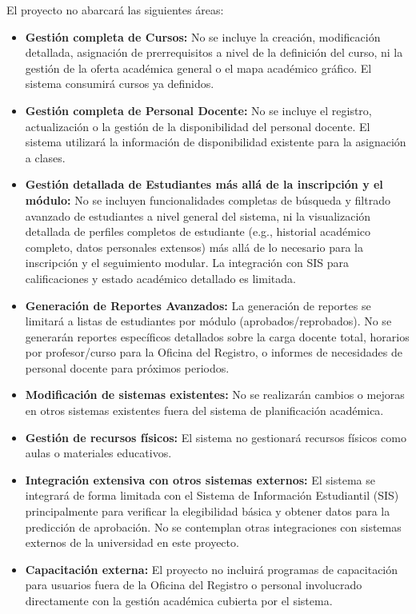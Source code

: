 El proyecto no abarcará las siguientes áreas:
\begin{itemize}
    \item \textbf{Gestión completa de Cursos:} No se incluye la creación, modificación detallada, asignación de prerrequisitos a nivel de la definición del curso, ni la gestión de la oferta académica general o el mapa académico gráfico.
    El sistema consumirá cursos ya definidos.
    \item \textbf{Gestión completa de Personal Docente:} No se incluye el registro, actualización o la gestión de la disponibilidad del personal docente.
    El sistema utilizará la información de disponibilidad existente para la asignación a clases.
    \item \textbf{Gestión detallada de Estudiantes más allá de la inscripción y el módulo:} No se incluyen funcionalidades completas de búsqueda y filtrado avanzado de estudiantes a nivel general del sistema, ni la visualización detallada de perfiles completos de estudiante (e.g., historial académico completo, datos personales extensos) más allá de lo necesario para la inscripción y el seguimiento modular.
    La integración con SIS para calificaciones y estado académico detallado es limitada.
    \item \textbf{Generación de Reportes Avanzados:} La generación de reportes se limitará a listas de estudiantes por módulo (aprobados/reprobados).
    No se generarán reportes específicos detallados sobre la carga docente total, horarios por profesor/curso para la Oficina del Registro, o informes de necesidades de personal docente para próximos periodos.
    \item \textbf{Modificación de sistemas existentes:} No se realizarán cambios o mejoras en otros sistemas existentes fuera del sistema de planificación académica.
    \item \textbf{Gestión de recursos físicos:} El sistema no gestionará recursos físicos como aulas o materiales educativos.
    \item \textbf{Integración extensiva con otros sistemas externos:} El sistema se integrará de forma limitada con el Sistema de Información Estudiantil (SIS) principalmente para verificar la elegibilidad básica y obtener datos para la predicción de aprobación.
    No se contemplan otras integraciones con sistemas externos de la universidad en este proyecto.
    \item \textbf{Capacitación externa:} El proyecto no incluirá programas de capacitación para usuarios fuera de la Oficina del Registro o personal involucrado directamente con la gestión académica cubierta por el sistema.

\end{itemize}
